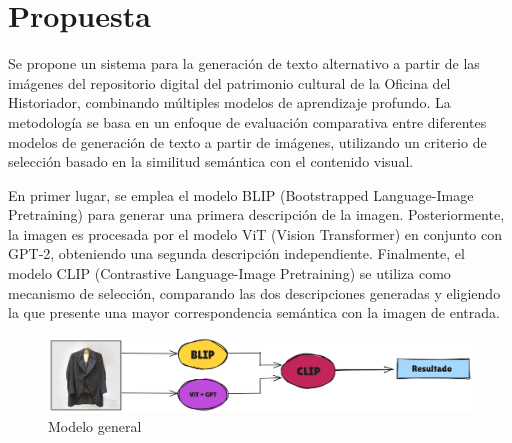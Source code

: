 
\chapter{Propuesta}\label{chapter:propuesta}
Se propone un sistema para la generación de texto alternativo a partir de las imágenes del repositorio digital del patrimonio cultural de la Oficina del Historiador, combinando múltiples modelos de aprendizaje profundo. La metodología se basa en un enfoque de evaluación comparativa entre diferentes modelos de generación de texto a partir de imágenes, utilizando un criterio de selección basado en la similitud semántica con el contenido visual.

En primer lugar, se emplea el modelo BLIP (Bootstrapped Language-Image Pretraining) para generar una primera descripción de la imagen. Posteriormente, la imagen es procesada por el modelo ViT (Vision Transformer) en conjunto con GPT-2, obteniendo una segunda descripción independiente. Finalmente, el modelo CLIP (Contrastive Language-Image Pretraining) se utiliza como mecanismo de selección, comparando las dos descripciones generadas y eligiendo la que presente una mayor correspondencia semántica con la imagen de entrada.

\begin{figure}
	\centering
	\includegraphics[width=1\linewidth]{./Graphics/diagrama}
	\caption{Modelo general}
	\label{fig:diagrama}
\end{figure}

